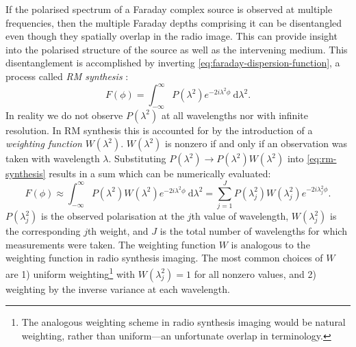 \documentclass[11pt, a4paper]{book}
\newcommand{\defn}[1]{\emph{#1}}
\begin{document}
        If the polarised spectrum of a Faraday complex source is observed at multiple frequencies, then the multiple Faraday depths comprising it can be disentangled even though they spatially overlap in the radio image. This can provide insight into the polarised structure of the source as well as the intervening medium. This disentanglement is accomplished by inverting \autoref{eq:faraday-dispersion-function}, a process called \defn{RM synthesis} \citep{brentjens_faraday_2005}:
        \begin{equation}
            \label{eq:rm-synthesis}
            F(\phi) = \int_{-\infty}^\infty P(\lambda^2) e^{-2i\lambda^2\phi}\ \mathrm{d}\lambda^2.
        \end{equation}
        In reality we do not observe $P(\lambda^2)$ at all wavelengths nor with infinite resolution. In RM synthesis this is accounted for by the introduction of a \defn{weighting function} \citep[or \defn{windowing function}, e.g.][]{heald09faraday} $W(\lambda^2)$. $W(\lambda^2)$ is nonzero if and only if an observation was taken with wavelength $\lambda$. Substituting $P(\lambda^2) \to P(\lambda^2) W(\lambda^2)$ into \autoref{eq:rm-synthesis} results in a sum which can be numerically evaluated:
        \begin{equation}
            \label{eq:weighted-rm-synthesis}
            F(\phi) \approx \int_{-\infty}^\infty P(\lambda^2) W(\lambda^2) e^{-2i\lambda^2\phi}\ \mathrm{d}\lambda^2 = \sum_{j = 1}^J P(\lambda^2_j) W(\lambda^2_j) e^{-2i\lambda^2_j\phi}.
        \end{equation}
        $P(\lambda^2_j)$ is the observed polarisation at the $j$th value of wavelength, $W(\lambda^2_j)$ is the corresponding $j$th weight, and $J$ is the total number of wavelengths for which measurements were taken. The weighting function $W$ is analogous to the weighting function in radio synthesis imaging. The most common choices of $W$ are 1) uniform weighting\footnote{The analogous weighting scheme in radio synthesis imaging would be natural weighting, rather than uniform---an unfortunate overlap in terminology.} with $W(\lambda_j^2) = 1$ for all nonzero values, and 2) weighting by the inverse variance at each wavelength.
\end{document}
